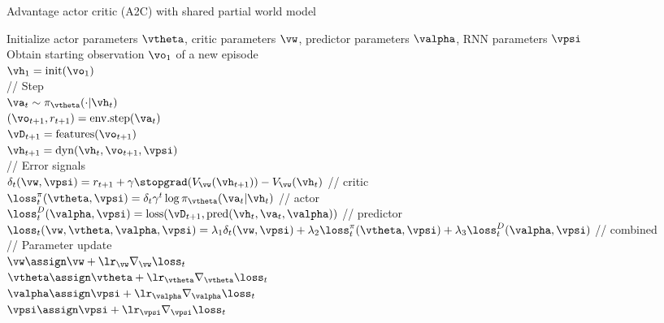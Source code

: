 \begin{algorithm}
\dontprintsemicolon
\caption{Advantage actor critic (A2C) with shared partial world model}
Initialize actor parameters $\vtheta$,
critic parameters $\vw$,
predictor parameters $\valpha$,
RNN parameters $\vpsi$\\
       {
         Obtain starting observation $\vo_1$ of a new episode \\
             $\vh_1 = \text{init}(\vo_1)$ \\
           {
            // Step \\
      $\va_t \sim \pi_{\vtheta}(\cdot|\vh_t)$ \\
      $(\vo_{t+1}, r_{t+1}) = \text{env.step}(\va_t)$ \\
            $\vD_{t+1} = \text{features}(\vo_{t+1})$ \\
       $\vh_{t+1} = \text{dyn}(\vh_{t}, \vo_{t+1}, \vpsi)$ \\
            
            // Error signals \\
            $\delta_t(\vw,\vpsi) = r_{t+1} +
            \gamma \stopgrad(V_{\vw}(\vh_{t+1})) - V_{\vw}(\vh_t)$ // critic\\
            $\loss_t^{\pi}(\vtheta,\vpsi) = \delta_t \gamma^t
              \log \pi_{\vtheta}(\va_t|\vh_t)$ // actor \\
              $\loss_{t}^{D}(\valpha,\vpsi) = \text{loss}(\vD_{t+1},
              \text{pred}(\vh_t, \va_t, \valpha))$ // predictor\\
              $\loss_t(\vw,\vtheta,\valpha,\vpsi) =
              \lambda_1 \delta_t(\vw,\vpsi)
              + \lambda_2 \loss_t^{\pi}(\vtheta,\vpsi)
              + \lambda_3 \loss_{t}^{D}(\valpha,\vpsi)$ // combined \\
       
        // Parameter update \\
        $\vw  \assign \vw + \lr_{\vw} \nabla_{\vw} \loss_t$\\
        $\vtheta  \assign \vtheta + \lr_{\vtheta} \nabla_{\vtheta} \loss_t$\\
        $\valpha  \assign \vpsi + \lr_{\valpha} \nabla_{\valpha} \loss_t$\\
        $\vpsi  \assign \vpsi + \lr_{\vpsi} \nabla_{\vpsi} \loss_t$
       }
}
\end{algorithm}



